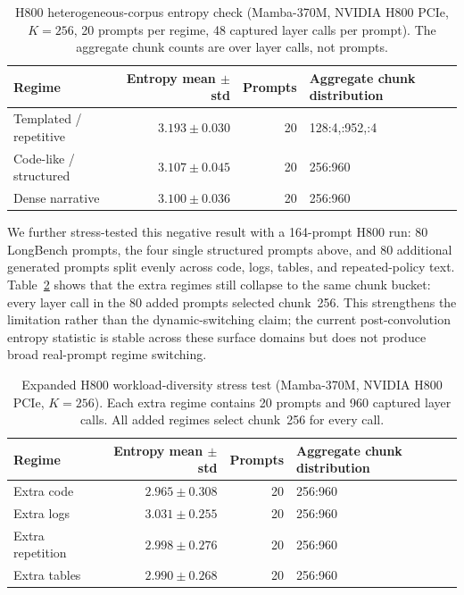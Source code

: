 \begin{table}[!t]
\centering
\caption{H800 heterogeneous-corpus entropy check (Mamba-370M, NVIDIA H800 PCIe, $K{=}256$, 20 prompts per regime, 48 captured layer calls per prompt). The aggregate chunk counts are over layer calls, not prompts.}
\label{tab:h800_heterogeneous}
\small
\begin{tabular}{lrrl}
\toprule
Regime & Entropy mean $\pm$ std & Prompts & Aggregate chunk distribution \\
\midrule
Templated / repetitive & $3.193 \pm 0.030$ & 20 & 128:4,\;256:952,\;512:4 \\
Code-like / structured & $3.107 \pm 0.045$ & 20 & 256:960 \\
Dense narrative & $3.100 \pm 0.036$ & 20 & 256:960 \\
\bottomrule
\end{tabular}
\end{table}

We further stress-tested this negative result with a 164-prompt H800 run:
80 LongBench prompts, the four single structured prompts above, and 80
additional generated prompts split evenly across code, logs, tables, and
repeated-policy text.  Table~\ref{tab:h800_diversity_extra} shows that the
extra regimes still collapse to the same chunk bucket: every layer call in the
80 added prompts selected chunk~256.  This strengthens the limitation rather
than the dynamic-switching claim; the current post-convolution entropy statistic
is stable across these surface domains but does not produce broad real-prompt
regime switching.

\begin{table}[!t]
\centering
\caption{Expanded H800 workload-diversity stress test (Mamba-370M, NVIDIA H800
PCIe, $K{=}256$). Each extra regime contains 20 prompts and 960 captured layer
calls. All added regimes select chunk~256 for every call.}
\label{tab:h800_diversity_extra}
\small
\begin{tabular}{lrrl}
\toprule
Regime & Entropy mean $\pm$ std & Prompts & Aggregate chunk distribution \\
\midrule
Extra code & $2.965 \pm 0.308$ & 20 & 256:960 \\
Extra logs & $3.031 \pm 0.255$ & 20 & 256:960 \\
Extra repetition & $2.998 \pm 0.276$ & 20 & 256:960 \\
Extra tables & $2.990 \pm 0.268$ & 20 & 256:960 \\
\bottomrule
\end{tabular}
\end{table}

